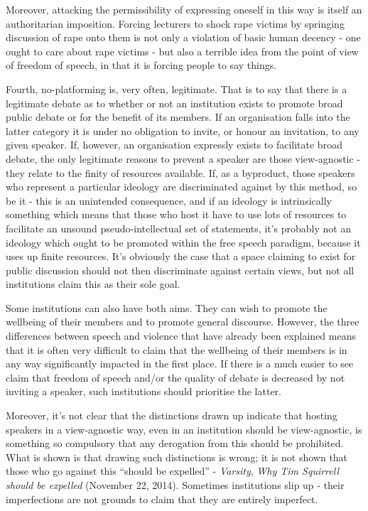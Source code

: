 Moreover, attacking the permissibility of expressing oneself in this way
is itself an authoritarian imposition. Forcing lecturers to shock rape
victims by springing discussion of rape onto them is not only a
violation of basic human decency - one ought to care about rape victims
- but also a terrible idea from the point of view of freedom of speech,
in that it is forcing people to say things.

Fourth, no-platforming is, very often, legitimate. That is to say that
there is a legitimate debate as to whether or not an institution exists
to promote broad public debate or for the benefit of its members. If an
organisation falls into the latter category it is under no obligation to
invite, or honour an invitation, to any given speaker. If, however, an
organisation expressly exists to facilitate broad debate, the only
legitimate reasons to prevent a speaker are those view-agnostic - they
relate to the finity of resources available. If, as a byproduct, those
speakers who represent a particular ideology are discriminated against
by this method, so be it - this is an unintended consequence, and if an
ideology is intrinsically something which means that those who host it
have to use lots of resources to facilitate an unsound
pseudo-intellectual set of statements, it's probably not an ideology
which ought to be promoted within the free speech paradigm, because it
uses up finite resources. It's obviously the case that a space claiming
to exist for public discussion should not then discriminate against
certain views, but not all institutions claim this as their sole goal.

Some institutions can also have both aims. They can wish to promote the
wellbeing of their members and to promote general discourse. However,
the three differences between speech and violence that have already been
explained means that it is often very difficult to claim that the
wellbeing of their members is in any way significantly impacted in the
first place. If there is a much easier to see claim that freedom of
speech and/or the quality of debate is decreased by not inviting a
speaker, such institutions should prioritise the latter.

Moreover, it's not clear that the distinctions drawn up indicate that
hosting speakers in a view-agnostic way, even in an institution should
be view-agnostic, is something so compulsory that any derogation from
this should be prohibited. What is shown is that drawing such
distinctions is wrong; it is not shown that those who go against this
``should be expelled'' - \emph{Varsity}, \emph{Why Tim Squirrell should
be expelled} (November 22, 2014). Sometimes institutions slip up - their
imperfections are not grounds to claim that they are entirely imperfect.

